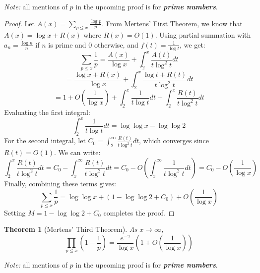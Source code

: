 \documentclass[a4paper]{article}
\newtheorem{theorem}{Theorem}
\begin{document}
\textit{Note:} all mentions of $p$ in the upcoming proof is for
\textbf{\textit{prime numbers}}.

\begin{proof}
  Let $A(x) = \sum_{p \le x} \frac{\log p}{p}$. From Mertens' First
  Theorem, we know that $A(x) = \log x + R(x)$ where $R(x) = O(1)$.
  Using partial summation with $a_n = \frac{\log n}{n}$ if $n$ is
  prime and $0$ otherwise, and $f(t) = \frac{1}{\log t}$, we get:
  \[ \sum_{p \le x} \frac{1}{p} = \frac{A(x)}{\log x} + \int_{2}^{x}
  \frac{A(t)}{t \log^2 t} dt \]
  \[ = \frac{\log x + R(x)}{\log x} + \int_{2}^{x} \frac{\log t +
  R(t)}{t \log^2 t} dt \]
  \[ = 1 + O\left(\frac{1}{\log x}\right) + \int_{2}^{x} \frac{1}{t
  \log t} dt + \int_{2}^{x} \frac{R(t)}{t \log^2 t} dt \]
  Evaluating the first integral:
  \[ \int_{2}^{x} \frac{1}{t \log t} dt = \log \log x - \log \log 2 \]
  For the second integral, let $C_0 = \int_{2}^{\infty} \frac{R(t)}{t
  \log^2 t} dt$, which converges since $R(t) = O(1)$. We can write:
  \[ \int_{2}^{x} \frac{R(t)}{t \log^2 t} dt = C_0 -
    \int_{x}^{\infty} \frac{R(t)}{t \log^2 t} dt = C_0 -
    O\left(\int_{x}^{\infty} \frac{1}{t \log^2 t} dt\right) = C_0 -
  O\left(\frac{1}{\log x}\right) \]
  Finally, combining these terms gives:
  \[ \sum_{p \le x} \frac{1}{p} = \log \log x + \left(1 - \log \log 2
  + C_0\right) + O\left(\frac{1}{\log x}\right) \]
  Setting $M = 1 - \log \log 2 + C_0$ completes the proof.
\end{proof}

\begin{theorem}[Mertens' Third Theorem]
  As $x \to \infty$,
  \[ \prod_{p \le x} \left(1 - \frac{1}{p}\right) =
    \frac{e^{-\gamma}}{\log x} \left(1 + O\left(\frac{1}{\log
  x}\right)\right) \]
\end{theorem}

\textit{Note:} all mentions of $p$ in the upcoming proof is for
\textbf{\textit{prime numbers}}.
\end{document}

